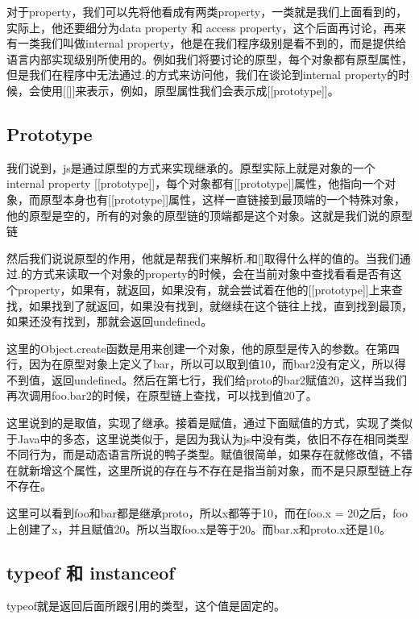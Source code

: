	对于property，我们可以先将他看成有两类property，一类就是我们上面看到的，实际上，他还要细分为data property 和 access property，这个后面再讨论，再来有一类我们叫做internal property，他是在我们程序级别是看不到的，而是提供给语言内部实现级别所使用的。例如我们将要讨论的原型，每个对象都有原型属性，但是我们在程序中无法通过.的方式来访问他，我们在谈论到internal property的时候，会使用[[]]来表示，例如，原型属性我们会表示成[[prototype]]。
	
	\subsection{Prototype}
	
	我们说到，js是通过原型的方式来实现继承的。原型实际上就是对象的一个internal property [[prototype]]，每个对象都有[[prototype]]属性，他指向一个对象，而原型本身也有[[prototype]]属性，这样一直链接到最顶端的一个特殊对象，他的原型是空的，所有的对象的原型链的顶端都是这个对象。这就是我们说的原型链
	
	然后我们说说原型的作用，他就是帮我们来解析.和[]取得什么样的值的。当我们通过.的方式来读取一个对象的property的时候，会在当前对象中查找看看是否有这个property，如果有，就返回，如果没有，就会尝试着在他的[[prototype]]上来查找，如果找到了就返回，如果没有找到，就继续在这个链往上找，直到找到最顶，如果还没有找到，那就会返回undefined。
	
	
	
	
	这里的Object.create函数是用来创建一个对象，他的原型是传入的参数。在第四行，因为在原型对象上定义了bar，所以可以取到值10，而bar2没有定义，所以得不到值，返回undefined。然后在第七行，我们给proto的bar2赋值20，这样当我们再次调用foo.bar2的时候，在原型链上查找，可以找到值20了。
	
	
	这里说到的是取值，实现了继承。接着是赋值，通过下面赋值的方式，实现了类似于Java中的多态，这里说类似于，是因为我认为js中没有类，依旧不存在相同类型不同行为，而是动态语言所说的鸭子类型。赋值很简单，如果存在就修改值，不错在就新增这个属性，这里所说的存在与不存在是指当前对象，而不是只原型链上存不存在。
	
	
		
		
	这里可以看到foo和bar都是继承proto，所以x都等于10，而在foo.x = 20之后，foo上创建了x，并且赋值20。所以当取foo.x是等于20。而bar.x和proto.x还是10。
	
	
	\subsection{typeof 和 instanceof}
	typeof就是返回后面所跟引用的类型，这个值是固定的。


